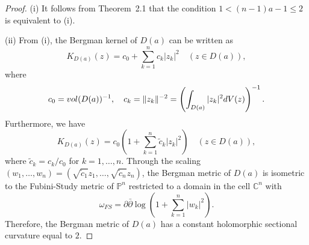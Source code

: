 \documentclass[10pt,a4paper]{amsart}
\newcommand{\C}{{\mathbb C}}
\newcommand{\PP}{{\mathbb P}}
\begin{document}
\begin{proof}

(i) \;\; It follows from Theorem~2.1 that 
the condition 
$1<(n-1)a-1\leq 2$ is equivalent to (i). 

(ii) \;\;
From (i), 
the Bergman kernel of $D(a)$ can be written
as 
\begin{equation}
K_{D(a)}(z)=c_0+\sum_{k=1}^n c_k |z_k|^2
\quad (z\in D(a)), 
\end{equation}
where 
$$
c_0={\rm vol} (D(a))^{-1}, 
\quad 
c_k=\|z_k\|^{-2}=
\left(\int_{D(a)} |z_k|^2 dV(z)\right)^{-1}.$$ 
Furthermore, we have
$$
K_{D(a)}(z)=
c_0\left(1+\sum_{k=1}^n \tilde{c}_k |z_k|^2\right)
\quad (z\in D(a)),
$$ 
where $\tilde{c}_k=c_k/c_0$ for
$k=1,\ldots,n$. 
Through
the scaling $(w_1,\ldots,w_n)=
(\sqrt{\tilde{c}_1}z_1,\ldots,
\sqrt{\tilde{c}_n}z_n)$,
the Bergman metric of $D(a)$ 
is isometric to the Fubini-Study metric
of $\PP^n$ restricted to 
a domain in the cell $\C^n$ with 
$$
\omega_{FS} =
\partial\bar{\partial} \log 
\left(
1+\sum_{k=1}^n |w_k|^2
\right). 
$$
Therefore, the Bergman metric of $D(a)$ 
has a constant holomorphic 
sectional curvature equal 
to $2$.
\end{proof}
\end{document}
